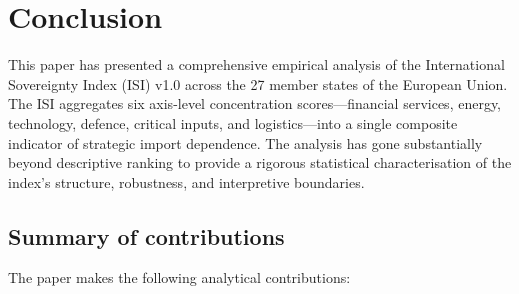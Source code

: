 \section{Conclusion}\label{sec:conclusion}

This paper has presented a comprehensive empirical analysis of the
International Sovereignty Index (ISI) v1.0 across the 27 member states
of the European Union.  The ISI aggregates six axis-level concentration
scores---financial services, energy, technology, defence, critical
inputs, and logistics---into a single composite indicator of strategic
import dependence.  The analysis has gone substantially beyond
descriptive ranking to provide a rigorous statistical characterisation
of the index's structure, robustness, and interpretive boundaries.

\subsection{Summary of contributions}

The paper makes the following analytical contributions:

